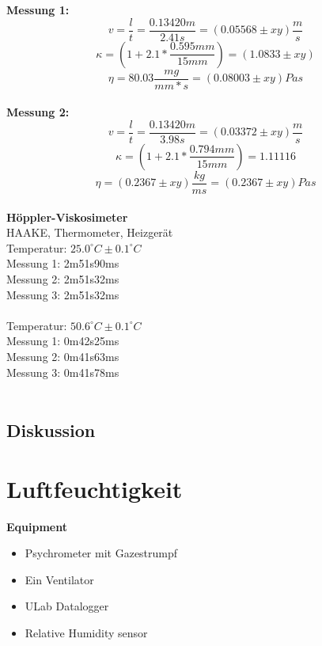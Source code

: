 \documentclass[12pt,a4paper]{article}
\begin{document}
\begin{multicols}{2}
\noindent
\textbf{Messung 1:}\\
$$v = \frac{l}{t} = \frac{0.13420m}{2.41s} =  (0.05568 \pm xy)\frac{m}{s}$$
$$\kappa =  (1+2.1 * \frac{0.595mm}{15mm}) = (1.0833 \pm xy)$$
$$\eta = 80.03\frac{mg}{mm*s} = (0.08003 \pm xy) Pa s$$
\\
\noindent
\textbf{Messung 2:}\\
$$v = \frac{l}{t} = \frac{0.13420m}{3.98s} =  (0.03372 \pm xy)\frac{m}{s}$$
$$\kappa = (1+2.1 * \frac{0.794mm}{15mm}) = 1.11116$$
$$\eta = (0.2367 \pm xy)\frac{kg}{m s} = (0.2367\pm xy) Pas$$
\\
\noindent
\textbf{Höppler-Viskosimeter}\\
HAAKE, Thermometer, Heizgerät\\
Temperatur: $25.0^{\circ}C \pm 0.1^{\circ}C$\\
Messung 1: 2m51s90ms\\
Messung 2: 2m51s32ms\\
Messung 3: 2m51s32ms\\
\\
Temperatur: $50.6^{\circ}C \pm 0.1^{\circ}C$\\
Messung 1: 0m42s25ms\\
Messung 2: 0m41s63ms\\
Messung 3: 0m41s78ms\\
\\
\subsection{Diskussion}


\section{Luftfeuchtigkeit}
\textbf{Equipment}
\begin{itemize}
	\item Psychrometer mit Gazestrumpf
	\item Ein Ventilator
	\item ULab Datalogger
	\item Relative Humidity sensor
\end{itemize}


\end{multicols}
\end{document}
